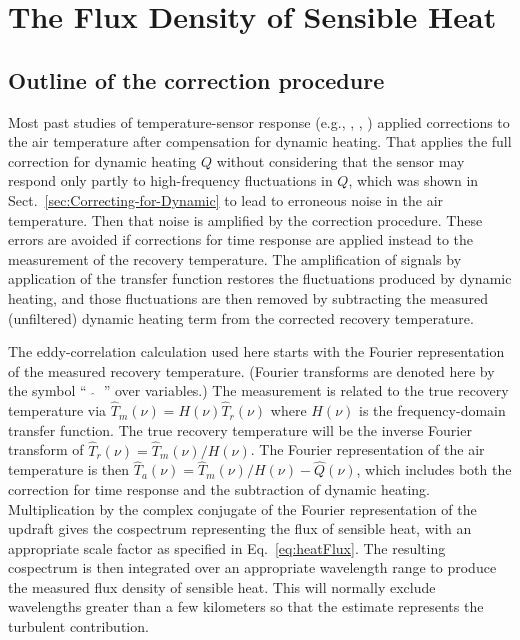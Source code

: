 \documentclass[amt, manuscript]{copernicus}
\begin{document}
\section{\texorpdfstring{The Flux Density of Sensible
Heat\label{sec:flux-density}}{The Flux Density of Sensible Heat}}

\subsection{\texorpdfstring{Outline of the correction
procedure\label{subsec:Outline-correction}}{Outline of the correction procedure}}

Most past studies of temperature-sensor response (e.g.,
\citet{mccarthy1973method}, \citet{nicholls1978measurements},
\citet{InverarityJTech2000}) applied corrections to the air temperature
after compensation for dynamic heating. That applies the full correction
for dynamic heating \(Q\) without considering that the sensor may
respond only partly to high-frequency fluctuations in \(Q\), which was
shown in Sect.~\ref{sec:Correcting-for-Dynamic} to lead to erroneous
noise in the air temperature. Then that noise is amplified by the
correction procedure. These errors are avoided if corrections for time
response are applied instead to the measurement of the recovery
temperature. The amplification of signals by application of the transfer
function restores the fluctuations produced by dynamic heating, and
those fluctuations are then removed by subtracting the measured
(unfiltered) dynamic heating term from the corrected recovery
temperature.

The eddy-correlation calculation used here starts with the Fourier
representation of the measured recovery temperature. (Fourier transforms
are denoted here by the symbol ``~\(\widehat{~}\)~'' over variables.)
The measurement is related to the true recovery temperature via
\(\hat{T}_{m}(\nu)=H(\nu)\hat{T}_{r}(\nu)\) where \(H(\nu)\) is the
frequency-domain transfer function. The true recovery temperature will
be the inverse Fourier transform of
\(\hat{T}_{r}(\nu)=\hat{T}_{m}(\nu)/H(\nu)\). The Fourier representation
of the air temperature is then
\(\hat{T}_{a}(\nu)=\hat{T}_{m}(\nu)/H(\nu)-\hat{Q}(\nu)\), which
includes both the correction for time response and the subtraction of
dynamic heating. Multiplication by the complex conjugate of the Fourier
representation of the updraft gives the cospectrum representing the flux
of sensible heat, with an appropriate scale factor as specified in
Eq.~\eqref{eq:heatFlux}. The resulting cospectrum is then integrated
over an appropriate wavelength range to produce the measured flux
density of sensible heat. This will normally exclude wavelengths greater
than a few kilometers so that the estimate represents the turbulent
contribution.
\end{document}
